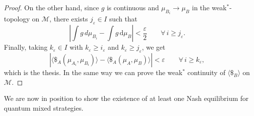 \documentclass[11pt,a4paper,twoside]{article}
\newcommand{\de}{\mathrm{d}} %
\begin{document}
\begin{proof}
On the other hand, since $g$ is continuous and $\mu_{B_i}\to\mu_B$ in the weak$^*$-topology on $\mathcal{M}$, there exists $j_\varepsilon \in I$ such that
$$\left| \int g\, d\mu_{B_i} - \int g\, \de\mu_B \right|< \frac{\varepsilon}{2} \qquad \forall\, i \geq j_\varepsilon.$$
Finally, taking $k_\varepsilon \in I$ with $k_\varepsilon \geq i_\varepsilon$ and $k_\varepsilon \geq j_\varepsilon$, we get  
$$| \langle\$_A(\mu_{A_i}, \mu_{B_i})\rangle - \langle \$_A(\mu_A, \mu_B)\rangle |<\varepsilon\qquad\forall\, i \geq k_\varepsilon,$$
which is the thesis. In the same way we can prove the weak$^*$ continuity of $\langle\$_B\rangle$ on $\mathcal{M}$.
\end{proof}

We are now in position to show the existence of at least one Nash equilibrium for quantum mixed strategies.
\end{document}
